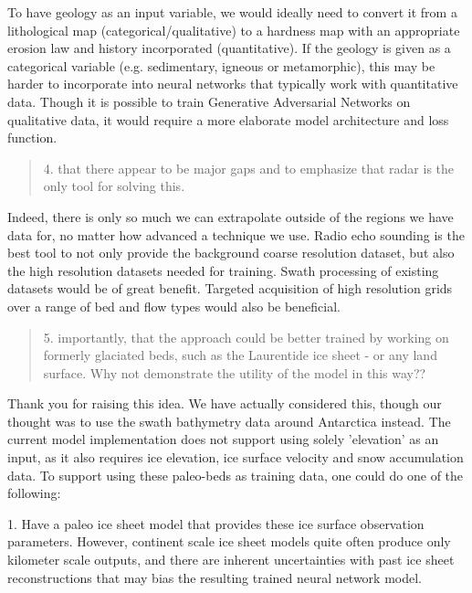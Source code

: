 To have geology as an input variable, we would ideally need to convert it from a lithological map (categorical/qualitative) to a hardness map with an appropriate erosion law and history incorporated (quantitative).
If the geology is given as a categorical variable (e.g. sedimentary, igneous or metamorphic), this may be harder to incorporate into neural networks that typically work with quantitative data.
Though it is possible to train Generative Adversarial Networks on qualitative data, it would require a more elaborate model architecture and loss function.

\begin{quote}
\color{blue}
  4. that there appear to be major gaps and to emphasize that radar is the only tool for solving this.
\end{quote}

Indeed, there is only so much we can extrapolate outside of the regions we have data for, no matter how advanced a technique we use.
Radio echo sounding is the best tool to not only provide the background coarse resolution dataset, but also the high resolution datasets needed for training.
Swath processing of existing datasets would be of great benefit.
Targeted acquisition of high resolution grids over a range of bed and flow types would also be beneficial.

\begin{quote}
\color{blue}
  5. importantly, that the approach could be better trained by working on formerly glaciated beds, such as the Laurentide ice sheet - or any land surface. Why not demonstrate the utility of the model in this way??
\end{quote}

Thank you for raising this idea.
We have actually considered this, though our thought was to use the swath bathymetry data around Antarctica instead.
The current model implementation does not support using solely 'elevation' as an input, as it also requires ice elevation, ice surface velocity and snow accumulation data.
To support using these paleo-beds as training data, one could do one of the following:

1. Have a paleo ice sheet model that provides these ice surface observation parameters.
However, continent scale ice sheet models quite often produce only kilometer scale outputs, and there are inherent uncertainties with past ice sheet reconstructions that may bias the resulting trained neural network model.

